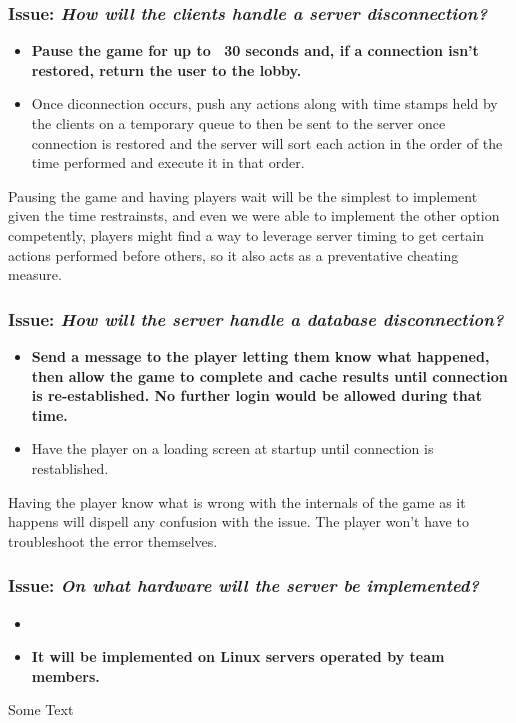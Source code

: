 \subsubsection*{Issue: \textit{How will the clients handle a server disconnection?}}

  \begin{itemize}
    \item \textbf{Pause the game for up to ~30 seconds and, if a connection isn't restored, return the user to the lobby.}
    \item Once diconnection occurs, push any actions along with time stamps held by the clients on a temporary queue to then be sent to the server once connection is restored and the server will sort each action in the order of the time performed and execute it in that order. 
  \end{itemize}

Pausing the game and having players wait will be the simplest to implement given the time restrainsts, and even we were able to implement the other option competently, players might find a way to leverage server timing to get certain actions performed before others, so it also acts as a preventative cheating measure.

\subsubsection*{Issue: \textit{How will the server handle a database disconnection?}}

  \begin{itemize}
    \item \textbf{Send a message to the player letting them know what happened, then allow the game to complete and cache results until connection is re-established. No further login would be allowed during that time.}
    \item Have the player on a loading screen at startup until connection is restablished.
  \end{itemize}

Having the player know what is wrong with the internals of the game as it happens will dispell any confusion with the issue. The player won't have to troubleshoot the error themselves.

\subsubsection*{Issue: \textit{On what hardware will the server be implemented?}}

  \begin{itemize}
    \item 
    \item \textbf{It will be implemented on Linux servers operated by team members.}
  \end{itemize}

Some Text
